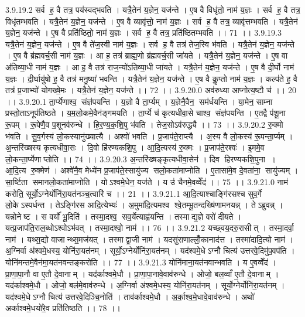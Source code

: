 3.9.19.2
सर्व॑ ह॒ वै तत्र॒ पय॑स्वद्भवति । यत्रै॒तेन॑ य॒ज्ञेन॒ यज॑न्ते । ए॒ष वै विधृ॑तो॒ नाम॑ य॒ज्ञः । सर्व॑ ह॒ वै तत्र॒ विधृ॑तम्भवति । यत्रै॒तेन॑ य॒ज्ञेन॒ यज॑न्ते । ए॒ष वै व्यावृ॑त्तो॒ नाम॑ य॒ज्ञः । सर्व॑ ह॒ वै तत्र॒ व्यावृ॑त्तम्भवति । यत्रै॒तेन॑ य॒ज्ञेन॒ यज॑न्ते । ए॒ष वै प्रति॑ष्ठितो॒ नाम॑ य॒ज्ञः । सर्व॑ ह॒ वै तत्र॒ प्रति॑ष्ठितम्भवति ।। 71 ।।
3.9.19.3
यत्रै॒तेन॑ य॒ज्ञेन॒ यज॑न्ते । ए॒ष वै ते॑ज॒स्वी नाम॑ य॒ज्ञः । सर्व॑ ह॒ वै तत्र॑ तेज॒स्वि भ॑वति । यत्रै॒तेन॑ य॒ज्ञेन॒ यज॑न्ते । ए॒ष वै ब्र॑ह्मवर्च॒सी नाम॑ य॒ज्ञः । आ ह॒ तत्र॑ ब्राह्म॒णो ब्र॑ह्मवर्च॒सी जा॑यते । यत्रै॒तेन॑ य॒ज्ञेन॒ यज॑न्ते । ए॒ष वा अ॑तिव्या॒धी नाम॑ य॒ज्ञः । आ ह॒ वै तत्र॑ राज॒न्यो॑ऽतिव्या॒धी जा॑यते । यत्रै॒तेन॑ य॒ज्ञेन॒ यज॑न्ते । ए॒ष वै दी॒र्घो नाम॑ य॒ज्ञः । दी॒र्घायु॑षो ह॒ वै तत्र॑ मनु॒ष्या॑ भवन्ति । यत्रै॒तेन॑ य॒ज्ञेन॒ यज॑न्ते । ए॒ष वै कॢ॒प्तो नाम॑ य॒ज्ञः । कल्प॑ते ह॒ वै तत्र॑ प्र॒जाभ्यो॑ योगख्षे॒मः । यत्रै॒तेन॑ य॒ज्ञेन॒ यज॑न्ते ।। 72 ।।
3.9.20.0
अव॑रुध्या आप्नोत्य॒ष्टौ च॑ ।। 20 ।।
3.9.20.1
ता॒र्प्येणाश्व॒॒ संज्ञ॑पयन्ति । य॒ज्ञो वै ता॒र्प्यम् । य॒ज्ञेनै॒वैन॒॒ सम॑र्धयन्ति । या॒मेन॒ साम्ना प्रस्तो॒ताऽनूप॑तिष्ठते । य॒म॒लो॒कमे॒वैन॑ङ्गमयति । ता॒र्प्ये च॑ कृत्यधीवा॒से चाश्व॒॒ संज्ञ॑पयन्ति । ए॒तद्वै प॑शू॒ना रू॒पम् । रू॒पेणै॒व प॒शूनव॑रुन्धे । हि॒र॒ण्य॒क॒शि॒पु भ॑वति । तेज॒सोऽव॑रुद्ध्यै ।। 73 ।।
3.9.20.2
रु॒क्मो भ॑वति । सु॒व॒र्गस्य॑ लो॒कस्यानु॑ख्यात्यै । अश्वो॑ भवति । प्र॒जाप॑ते॒राप्त्यै । अ॒स्य वै लो॒कस्य॑ रू॒पन्ता॒र्प्यम् । अ॒न्तरि॑ख्षस्य कृत्यधीवा॒सः । दि॒वो हि॑रण्यकशि॒पु । आ॒दि॒त्यस्य॑ रु॒क्मः । प्र॒जाप॑ते॒रश्वः॑ । इ॒ममे॒व लो॒कन्ता॒र्प्येणाप्तोति ।। 74 ।।
3.9.20.3
अ॒न्तरि॑ख्षङ्कृत्यधीवा॒सेन॑ । दिव॑ हिरण्यकशि॒पुना । आ॒दि॒त्य रु॒क्मेण॑ । अश्वे॑नै॒व मेध्ये॑न प्र॒जाप॑ते॒स्सायु॑ज्य सलो॒कता॑माप्नोति । ए॒तासा॑मे॒व दे॒वता॑ना॒॒ सायु॑ज्यम् । सा॒र्ष्टिता॑ समानलो॒कता॑माप्नोति । योऽश्वमे॒धेन॒ यज॑ते । य उ॑ चैनमे॒वव्वेँद॑ ।। 75 ।।
3.9.21.0
नाम॑ करोति॒ सूर्यो॒ऽग्नेर्योनि॑रा॒यत॑नञ्च॒त्वारि॑ च ।। 21 ।।
3.9.21.1
आ॒दि॒त्याश्चाङ्गि॑रसश्च सुव॒र्गे लो॒केऽस्पर्धन्त । तेऽङ्गि॑रस आदि॒त्येभ्यः॑ । अ॒मुमा॑दि॒त्यमश्व॑ श्वे॒तम्भू॒तन्दख्षि॑णामनयन्न् । तेऽब्रुवन्न् । यन्नोनेष्ट । स वर्यो॑ भू॒दिति॑ । तस्मा॒दश्व॒ सव॒र्येत्याह्व॑यन्ति । तस्माद्य॒ज्ञे वरो॑ दीयते । यत्प्र॒जाप॑ति॒राल॒ब्धोऽश्वोऽभ॑वत् । तस्मा॒दश्वो॒ नाम॑ ।। 76 ।।
3.9.21.2
यच्छ्वय॒दरु॒रासीत् । तस्मा॒दर्वा॒ नाम॑ । यथ्स॒द्यो वाजान्थ्स॒मज॑यत् । तस्माद्वा॒जी नाम॑ । यदसु॑राणाल्लोँ॒कानाद॑त्त । तस्मा॑दादि॒त्यो नाम॑ । अ॒ग्निर्वा अ॑श्वमे॒धस्य॒ योनि॑रा॒यत॑नम् । सूर्यो॒ऽग्नेर्योनि॑रा॒यत॑नम् । यद॑श्वमे॒धेऽग्नौ चित्य॑ उत्तरवे॒दिमु॑प॒वप॑ति । योनि॑मन्तमे॒वैन॑मा॒यत॑नवन्तङ्करोति ।। 77 ।।
3.9.21.3
योनि॑माना॒यत॑नवान्भवति । य ए॒वव्वेँद॑ । प्रा॒णा॒पा॒नौ वा ए॒तौ दे॒वानाम् । यद॑र्काश्वमे॒धौ । प्रा॒णा॒पा॒नावे॒वाव॑रुन्धे । ओजो॒ बल॒व्वाँ ए॒तौ दे॒वानाम् । यद॑र्काश्वमे॒धौ । ओजो॒ बल॑मे॒वाव॑रुन्धे । अ॒ग्निर्वा अ॑श्वमे॒धस्य॒ योनि॑रा॒यत॑नम् । सूर्यो॒ग्नेर्योनि॑रा॒यत॑नम् । यद॑श्वमे॒धेऽग्नौ चित्य॑ उत्तरवे॒दिञ्चि॒नोति॑ । ताव॑र्काश्वमे॒धौ । अ॒र्का॒श्व॒मे॒धावे॒वाव॑रुन्धे । अथो॑ अर्काश्वमे॒धयो॑रे॒व प्रति॑तिष्ठति ।। 78 ।।
